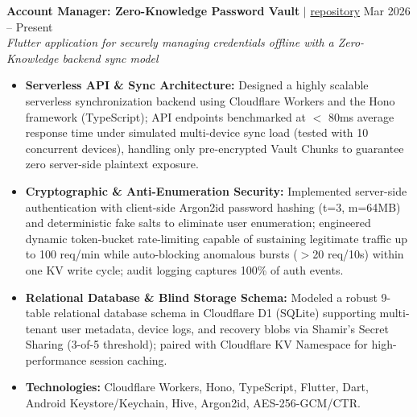 \documentclass[10pt,a4paper]{article}
\begin{document}
\noindent \textbf{Account Manager: Zero-Knowledge Password Vault} $|$ \href{https://github.com/Chickyo/Account-Manager}{repository} \hfill Mar 2026 -- Present\\
\textit{Flutter application for securely managing credentials offline with a Zero-Knowledge backend sync model}
\begin{itemize}[leftmargin=0.25in, nosep]
    \item \textbf{Serverless API \& Sync Architecture:} Designed a highly scalable serverless synchronization backend using Cloudflare Workers and the Hono framework (TypeScript); API endpoints benchmarked at $<$ 80ms average response time under simulated multi-device sync load (tested with 10 concurrent devices), handling only pre-encrypted Vault Chunks to guarantee zero server-side plaintext exposure.
    \item \textbf{Cryptographic \& Anti-Enumeration Security:} Implemented server-side authentication with client-side Argon2id password hashing (t=3, m=64MB) and deterministic fake salts to eliminate user enumeration; engineered dynamic token-bucket rate-limiting capable of sustaining legitimate traffic up to 100 req/min while auto-blocking anomalous bursts ($>$20 req/10s) within one KV write cycle; audit logging captures 100\% of auth events.
    \item \textbf{Relational Database \& Blind Storage Schema:} Modeled a robust 9-table relational database schema in Cloudflare D1 (SQLite) supporting multi-tenant user metadata, device logs, and recovery blobs via Shamir's Secret Sharing (3-of-5 threshold); paired with Cloudflare KV Namespace for high-performance session caching.
    \item \textbf{Technologies:} Cloudflare Workers, Hono, TypeScript, Flutter, Dart, Android Keystore/Keychain, Hive, Argon2id, AES-256-GCM/CTR.
\end{itemize}
\vspace{10pt}
\end{document}

